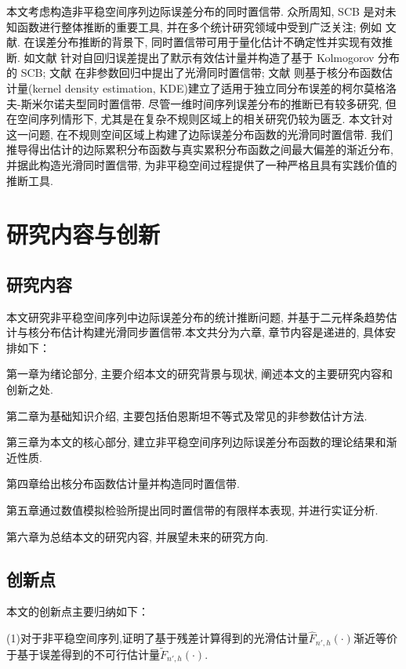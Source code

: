 \documentclass[a4paper,openay,14pt]{ctexbook}
\numberwithin{equation}{section}
\numberwithin{lem}{section}
\begin{document}
本文考虑构造非平稳空间序列边际误差分布的同时置信带. 众所周知, SCB 是对未知函数进行整体推断的重要工具, 并在多个统计研究领域中受到广泛关注; 例如
文献\cite{wang2013smooth, gu2014simultaneous, wang2014oracally, cao2016oracle, zhang2018smooth, wang2022oracle}.
在误差分布推断的背景下, 同时置信带可用于量化估计不确定性并实现有效推断. 如文献\cite{wang2014oracally} 针对自回归误差提出了默示有效估计量并构造了基于 Kolmogorov 分布的 SCB; 文献\cite{gu2021smooth} 在非参数回归中提出了光滑同时置信带; 文献\cite{wang2022oracle} 则基于核分布函数估计量(kernel density estimation, KDE)建立了适用于独立同分布误差的柯尔莫格洛夫-斯米尔诺夫型同时置信带. 尽管一维时间序列误差分布的推断已有较多研究, 但在空间序列情形下, 尤其是在复杂不规则区域上的相关研究仍较为匮乏. 本文针对这一问题, 在不规则空间区域上构建了边际误差分布函数的光滑同时置信带. 我们推导得出估计的边际累积分布函数与真实累积分布函数之间最大偏差的渐近分布, 并据此构造光滑同时置信带, 为非平稳空间过程提供了一种严格且具有实践价值的推断工具.


\section{研究内容与创新}
\subsection{研究内容}
本文研究非平稳空间序列中边际误差分布的统计推断问题,  并基于二元样条趋势估计与核分布估计构建光滑同步置信带.本文共分为六章,  章节内容是递进的,  具体安排如下：

第一章为绪论部分,  主要介绍本文的研究背景与现状,  阐述本文的主要研究内容和创新之处. 

第二章为基础知识介绍,  主要包括伯恩斯坦不等式及常见的非参数估计方法. 

第三章为本文的核心部分,   建立非平稳空间序列边际误差分布函数的理论结果和渐近性质.

第四章给出核分布函数估计量并构造同时置信带. 

第五章通过数值模拟检验所提出同时置信带的有限样本表现, 并进行实证分析. 

第六章为总结本文的研究内容,  并展望未来的研究方向. 

\subsection{创新点}
本文的创新点主要归纳如下：

(1)对于非平稳空间序列,证明了基于残差计算得到的光滑估计量$\hat{F}_{n',h}(\cdot)$渐近等价于基于误差得到的不可行估计量$\tilde{F}_{n',h}(\cdot)$.
\end{document}
